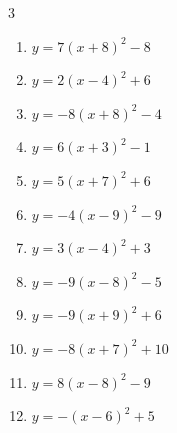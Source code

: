 \begin{multicols}{3}
\begin{enumerate}
  \item $\displaystyle y=7\left( x+8\right)^{2}-8$

        \phantom{$\displaystyle 頂点\left( -8 , -8 \right)$}

  \item $\displaystyle y=2\left( x-4\right)^{2}+6$

        \phantom{$\displaystyle 頂点\left( 4 , 6 \right)$}

  \item $\displaystyle y=-8\left( x+8\right)^{2}-4$

        \phantom{$\displaystyle 頂点\left( -8 , -4 \right)$}

  \item $\displaystyle y=6\left( x+3\right)^{2}-1$

        \phantom{$\displaystyle 頂点\left( -3 , -1 \right)$}

  \item $\displaystyle y=5\left( x+7\right)^{2}+6$

        \phantom{$\displaystyle 頂点\left( -7 , 6 \right)$}

  \item $\displaystyle y=-4\left( x-9\right)^{2}-9$

        \phantom{$\displaystyle 頂点\left( 9 , -9 \right)$}

  \item $\displaystyle y=3\left( x-4\right)^{2}+3$

        \phantom{$\displaystyle 頂点\left( 4 , 3 \right)$}

  \item $\displaystyle y=-9\left( x-8\right)^{2}-5$

        \phantom{$\displaystyle 頂点\left( 8 , -5 \right)$}

  \item $\displaystyle y=-9\left( x+9\right)^{2}+6$

        \phantom{$\displaystyle 頂点\left( -9 , 6 \right)$}

  \item $\displaystyle y=-8\left( x+7\right)^{2}+10$

        \phantom{$\displaystyle 頂点\left( -7 , 10 \right)$}

  \item $\displaystyle y=8\left( x-8\right)^{2}-9$

        \phantom{$\displaystyle 頂点\left( 8 , -9 \right)$}

  \item $\displaystyle y=-\left( x-6\right)^{2}+5$


\end{enumerate}
\end{multicols}
